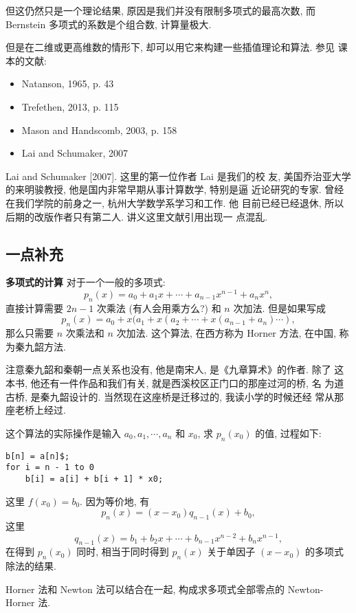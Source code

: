 \documentclass[a4paper]{ctexart}
\begin{document}
但这仍然只是一个理论结果, 原因是我们并没有限制多项式的最高次数, 而 Bernstein 多项式的系数是个组合数, 
计算量极大.

但是在二维或更高维数的情形下, 却可以用它来构建一些插值理论和算法. 参见
课本的文献: 
\begin{itemize}
  \item Natanson, 1965, p. 43
  \item Trefethen, 2013, p. 115
  \item Mason and Handscomb, 2003, p. 158
  \item Lai and Schumaker, 2007
\end{itemize}

Lai and Schumaker [2007]. 这里的第一位作者 Lai 是我们的校
友, 美国乔治亚大学的来明骏教授, 他是国内非常早期从事计算数学, 特别是逼
近论研究的专家. 曾经在我们学院的前身之一, 杭州大学数学系学习和工作. 他
目前已经已经退休, 所以后期的改版作者只有第二人. 讲义这里文献引用出现一
点混乱.

\subsection{一点补充}

{\bf 多项式的计算} 对于一个一般的多项式:
$$
p_n(x) = a_0 + a_1 x + \cdots + a_{n - 1} x^{n - 1} + a_n x^n, 
$$
直接计算需要 $2n - 1$ 次乘法 (有人会用乘方么?) 和 $n$ 次加法. 但是如果写成
$$
p_n(x) = a_0 + x(a_1 + x(a_2 + \cdots + x(a_{n - 1} + a_n) \cdots ),
$$
那么只需要 $n$ 次乘法和 $n$ 次加法. 这个算法, 在西方称为 Horner 方法,
在中国, 称为秦九韶方法.

注意秦九韶和秦朝一点关系也没有, 他是南宋人, 是《九章算术》的作者. 除了
这本书, 他还有一件作品和我们有关, 就是西溪校区正门口的那座过河的桥, 名
为道古桥, 是秦九韶设计的. 当然现在这座桥是迁移过的, 我读小学的时候还经
常从那座老桥上经过.

这个算法的实际操作是输入 $a_0, a_1, \cdots, a_n$ 和 $x_0$, 求
$p_n(x_0)$ 的值, 过程如下:

\begin{verbatim}
b[n] = a[n]$;
for i = n - 1 to 0
    b[i] = a[i] + b[i + 1] * x0;
\end{verbatim}

这里 $f(x_0) = b_0$.  因为等价地, 有
$$
p_n(x) = (x - x_0)q_{n - 1}(x) + b_0,
$$
这里
$$
q_{n - 1}(x) = b_1 + b_2 x + \cdots + b_{n - 1} x^{n - 2} + b_n x^{n - 1},
$$
在得到 $p_n(x_0)$ 同时, 相当于同时得到 $p_n(x)$ 关于单因子 $(x -
x_0)$ 的多项式除法的结果.

Horner 法和 Newton 法可以结合在一起, 构成求多项式全部零点的
Newton-Horner 法.
\end{document}
